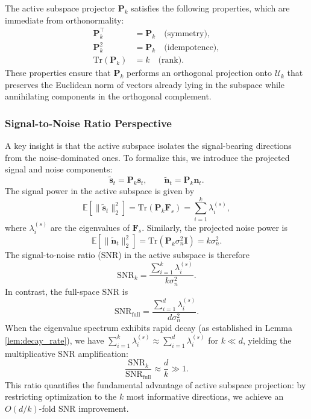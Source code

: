 \documentclass[preprint,12pt]{elsarticle}
\begin{document}
The active subspace projector $\mathbf{P}_k$ satisfies the following properties, which are immediate from orthonormality:
\begin{align}
\label{eq:projector_properties}
\mathbf{P}_k^\top &= \mathbf{P}_k \quad \text{(symmetry)}, \\
\mathbf{P}_k^2 &= \mathbf{P}_k \quad \text{(idempotence)}, \\
\text{Tr}(\mathbf{P}_k) &= k \quad \text{(rank)}.
\end{align}
These properties ensure that $\mathbf{P}_k$ performs an orthogonal projection onto $\mathcal{U}_k$ that preserves the Euclidean norm of vectors already lying in the subspace while annihilating components in the orthogonal complement.

\subsubsection{Signal-to-Noise Ratio Perspective}

A key insight is that the active subspace isolates the signal-bearing directions from the noise-dominated ones. To formalize this, we introduce the projected signal and noise components:
\begin{equation}
\label{eq:projected_signal_noise}
\tilde{\mathbf{s}}_t = \mathbf{P}_k \mathbf{s}_t, \qquad \tilde{\mathbf{n}}_t = \mathbf{P}_k \mathbf{n}_t.
\end{equation}
The signal power in the active subspace is given by
\begin{equation}
\label{eq:signal_power}
\mathbb{E}\left[\|\tilde{\mathbf{s}}_t\|_2^2\right] = \text{Tr}(\mathbf{P}_k \mathbf{F}_s) = \sum_{i=1}^{k} \lambda_i^{(s)},
\end{equation}
where $\lambda_i^{(s)}$ are the eigenvalues of $\mathbf{F}_s$. Similarly, the projected noise power is
\begin{equation}
\label{eq:noise_power}
\mathbb{E}\left[\|\tilde{\mathbf{n}}_t\|_2^2\right] = \text{Tr}(\mathbf{P}_k \sigma_n^2 \mathbf{I}) = k \sigma_n^2.
\end{equation}
The signal-to-noise ratio (SNR) in the active subspace is therefore
\begin{equation}
\label{eq:snr_active}
\text{SNR}_k = \frac{\sum_{i=1}^{k} \lambda_i^{(s)}}{k \sigma_n^2}.
\end{equation}
In contrast, the full-space SNR is
\begin{equation}
\label{eq:snr_full}
\text{SNR}_{\text{full}} = \frac{\sum_{i=1}^{d} \lambda_i^{(s)}}{d \sigma_n^2}.
\end{equation}
When the eigenvalue spectrum exhibits rapid decay (as established in Lemma \ref{lem:decay_rate}), we have $\sum_{i=1}^{k} \lambda_i^{(s)} \approx \sum_{i=1}^{d} \lambda_i^{(s)}$ for $k \ll d$, yielding the multiplicative SNR amplification:
\begin{equation}
\label{eq:snr_amplification}
\frac{\text{SNR}_k}{\text{SNR}_{\text{full}}} \approx \frac{d}{k} \gg 1.
\end{equation}
This ratio quantifies the fundamental advantage of active subspace projection: by restricting optimization to the $k$ most informative directions, we achieve an $O(d/k)$-fold SNR improvement.
\end{document}
